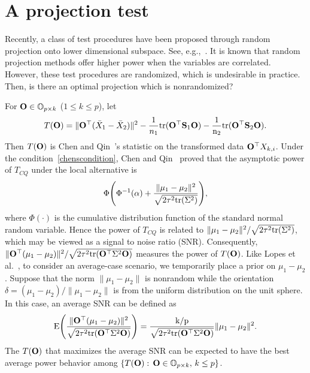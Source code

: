 \documentclass[times,sort&compress,3p]{elsarticle}
\newcommand{\mytr}{\rm tr}
\newcommand{\myE}{\rm E}
\theoremstyle{plain}
\theoremstyle{definition}
\theoremstyle{remark}
\begin{document}
\section{A projection test}\label{methodology}


Recently, a class of test procedures have been proposed through random projection onto lower dimensional subspace. See, e.g.,~\cite{Lopes2015A,Srivastava2014RAPTT,Thulin2014A}.
It is known that random projection methods offer higher power when the variables are correlated.
However, these test procedures are randomized, which is undesirable in practice.
Then, is there an optimal projection which is nonrandomized?

For $\mathbf{O}\in \mathbb{O}_{p\times k}$ ($1\leq k\leq p$), let
$$
    T(\BO)=\|\BO^\top (\bar{X}_1-\bar{X}_2)\|^2-\frac{1}{n_1}\mytr(\BO^\top  \BS_1\BO)-\frac{1}{n_2}\mytr(\BO^\top  \BS_2\BO).
$$
Then $T(\mathbf{O})$ is Chen and Qin~\cite{Chen2010A}'s statistic on the transformed data $\mathbf{O}^\top  X_{k,i}$.
Under the condition~\eqref{chenscondition}, Chen and Qin~\cite{Chen2010A} proved that the asymptotic power of $T_{CQ}$ under the local alternative is
$$
\Phi\Bigg(\Phi^{-1}(\alpha)+\frac{\|\mu_1-\mu_2\|^2}{\sqrt{2\tau^2\mytr(\bSigma^2)}}\Bigg),
$$
where $\Phi(\cdot)$ is the cumulative distribution function of the standard normal random variable.
Hence the power of $T_{CQ}$ is related to $\|\mu_1-\mu_2\|^2/\sqrt{2\tau^2\mytr(\bSigma^2)}$, which may be viewed as a signal to noise ratio (SNR).
Consequently, $\|\BO^\top  (\mu_1-\mu_2)\|^2/\sqrt{2\tau^2\mytr(\BO^\top  \bSigma^2 \BO)}$ measures the power of $T(\mathbf{O})$.
 Like Lopes {\rm et al.}~\cite{Lopes2015A}, to consider an average-case scenario, we temporarily place a prior on $\mu_1-\mu_2$.
Suppose that the norm $\|\mu_1-\mu_2\|$ is nonrandom while the orientation $\delta=(\mu_1-\mu_2)/\|\mu_1-\mu_2\|$ is from the uniform distribution on the unit sphere.
In this case, an average SNR can be defined as
\begin{equation}\label{touteng}
\myE \Bigg( \frac{\|\BO^\top  (\mu_1-\mu_2)\|^2}{\sqrt{2\tau^2\mytr(\BO^\top  \bSigma^2 \BO)}}\Bigg)
=  \frac{k/p}{\sqrt{2\tau^2\mytr(\BO^\top  \bSigma^2 \BO)}}\|\mu_1-\mu_2\|^2.
\end{equation}
The $T(\mathbf{O})$ that maximizes the average SNR can be expected to have the best average power behavior among $\{T(\mathbf{O}):\, \mathbf{O}\in \mathbb{O}_{p\times k},\,  k\leq p\}$.
\end{document}
